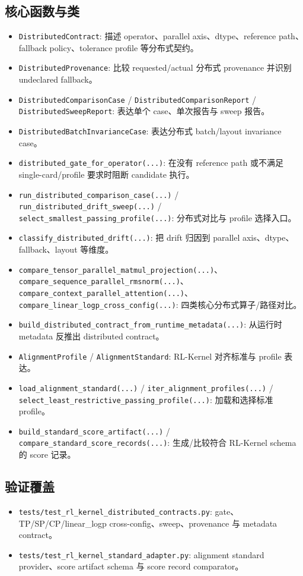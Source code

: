 \documentclass[11pt,a4paper]{ctexart}
\newcommand{\code}[1]{{\small\nolinkurl{#1}}}
\begin{document}
\subsection{核心函数与类}
\begin{itemize}
  \item \code{DistributedContract}: 描述 operator、parallel axis、dtype、reference path、fallback policy、tolerance profile 等分布式契约。
  \item \code{DistributedProvenance}: 比较 requested/actual 分布式 provenance 并识别 undeclared fallback。
  \item \code{DistributedComparisonCase} / \code{DistributedComparisonReport} / \code{DistributedSweepReport}: 表达单个 case、单次报告与 sweep 报告。
  \item \code{DistributedBatchInvarianceCase}: 表达分布式 batch/layout invariance case。
  \item \code{distributed_gate_for_operator(...)}: 在没有 reference path 或不满足 single-card/profile 要求时阻断 candidate 执行。
  \item \code{run_distributed_comparison_case(...)} / \code{run_distributed_drift_sweep(...)} / \code{select_smallest_passing_profile(...)}: 分布式对比与 profile 选择入口。
  \item \code{classify_distributed_drift(...)}: 把 drift 归因到 parallel axis、dtype、fallback、layout 等维度。
  \item \code{compare_tensor_parallel_matmul_projection(...)}、\code{compare_sequence_parallel_rmsnorm(...)}、\code{compare_context_parallel_attention(...)}、\code{compare_linear_logp_cross_config(...)}: 四类核心分布式算子/路径对比。
  \item \code{build_distributed_contract_from_runtime_metadata(...)}: 从运行时 metadata 反推出 distributed contract。
  \item \code{AlignmentProfile} / \code{AlignmentStandard}: RL-Kernel 对齐标准与 profile 表达。
  \item \code{load_alignment_standard(...)} / \code{iter_alignment_profiles(...)} / \code{select_least_restrictive_passing_profile(...)}: 加载和选择标准 profile。
  \item \code{build_standard_score_artifact(...)} / \code{compare_standard_score_records(...)}: 生成/比较符合 RL-Kernel schema 的 score 记录。
\end{itemize}

\subsection{验证覆盖}
\begin{itemize}
  \item \code{tests/test_rl_kernel_distributed_contracts.py}: gate、TP/SP/CP/linear\_logp cross-config、sweep、provenance 与 metadata contract。
  \item \code{tests/test_rl_kernel_standard_adapter.py}: alignment standard provider、score artifact schema 与 score record comparator。
\end{itemize}
\end{document}
